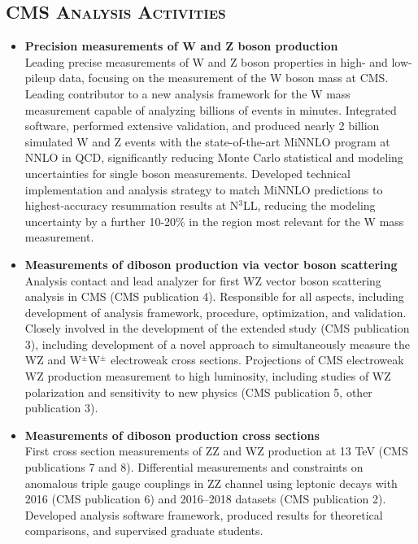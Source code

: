 \documentclass[10pt]{res} %
\begin{document}
\begin{resume}
\section{\textsc{CMS Analysis Activities}}
\begin{itemize}
  \item\textbf{{Precision measurements of W and Z boson production}} \\
    Leading precise measurements of W and Z boson properties in high- and low-pileup data,
    focusing on the measurement of the W boson mass at CMS.
    Leading contributor to a new analysis framework for the W mass measurement 
    capable of analyzing billions of events in minutes.
    Integrated software, performed extensive validation, and produced nearly 2 billion simulated
    W and Z events with the state-of-the-art MiNNLO program at NNLO in QCD,
    significantly reducing Monte Carlo statistical and modeling uncertainties
    for single boson measurements.
    Developed technical implementation and analysis strategy to match MiNNLO predictions to
    highest-accuracy resummation results at N$^{3}$LL, 
    reducing the modeling uncertainty by a further 10-20\% in the region most relevant for the W mass measurement.
    
  \item\textbf{{Measurements of diboson production via vector boson scattering}} \\
    Analysis contact and lead analyzer for first WZ vector boson scattering analysis in CMS (CMS publication 4).
    Responsible for all aspects, 
    including development of analysis framework, procedure, optimization, and validation. 
    Closely involved in the development of the extended study (CMS publication 3), including 
    development of a novel approach
    to simultaneously measure the WZ and W$^{\pm}$W$^{\pm}$ electroweak cross sections.
    Projections of CMS electroweak WZ production measurement to high luminosity, including studies of
    WZ polarization and sensitivity to new physics (CMS publication 5, other publication 3). 

  \item\textbf{{Measurements of diboson production cross sections}} \\
    First cross section measurements
    of ZZ and WZ production at 13 TeV (CMS publications 7 and 8). 
    Differential measurements and constraints on anomalous
    triple gauge couplings in ZZ channel using leptonic decays
    with 2016 (CMS publication 6) and 2016--2018 datasets (CMS publication 2). 
    Developed analysis software framework, produced results for theoretical comparisons, 
    and supervised graduate students.
    

\end{itemize}
\end{resume}
\end{document}
